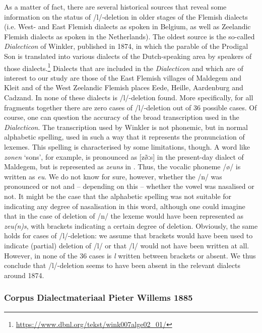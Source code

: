 \documentclass[output=paper,hidelinks,draftmode]{langscibook}
\begin{document}
As a matter of fact, there are several historical sources that reveal some information on the status of /l/-deletion in older stages of the Flemish dialects (i.e. West- and East Flemish dialects as spoken in Belgium, as well as Zeelandic Flemish dialects as spoken in the Netherlands). The oldest source is the so-called \textit{Dialecticon} of Winkler, published in 1874, in which the parable of the Prodigal Son is translated into various dialects of the Dutch-speaking area by speakers of those dialects.\footnote{ \url{https://www.dbnl.org/tekst/wink007alge02_01/} } Dialects that are included in the \textit{Dialecticon} and which are of interest to our study are those of the East Flemish villages of Maldegem and Kleit and of the West Zeelandic Flemish places Eede, Heille, Aardenburg and Cadzand. In none of these dialects is /l/-deletion found. More specifically, for all fragments together there are zero cases of /l/-deletion out of 36 possible cases. Of course, one can question the accuracy of the broad transcription used in the \textit{Dialecticon}. The transcription used by Winkler is not phonemic, but in normal alphabetic spelling, used in such a way that it represents the pronunciation of lexemes. This spelling is characterised by some limitations, though. A word like \textit{zonen} ‘sons’, for example, is pronounced as [z\~{ø}ːs] in the present-day dialect of Maldegem, but is represented as \textit{zeuns} in \citet{Winkler1874}. Thus, the vocalic phoneme /ø/ is written as \textit{eu}. We do not know for sure, however, whether the /n/ was pronounced or not and – depending on this – whether the vowel was nasalised or not. It might be the case that the alphabetic spelling was not suitable for indicating any degree of nasalisation in this word, although one could imagine that in the case of deletion of /n/ the lexeme would have been represented as \textit{zeu(n)s}, with brackets indicating a certain degree of deletion. Obviously, the same holds for cases of /l/-deletion: we assume that brackets would have been used to indicate (partial) deletion of /l/ or that /l/ would not have been written at all. However, in none of the 36 cases is \textit{l} written between brackets or absent. We thus conclude that /l/-deletion seems to have been absent in the relevant dialects around 1874.

\subsubsection{Corpus Dialectmateriaal Pieter Willems 1885}
\end{document}
